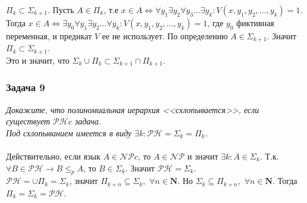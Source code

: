 \documentclass{article}
\begin{document}
$\Pi_k \subset \Sigma_{k+1}$. Пусть $A \in \Pi_k$, т.е $x \in A \Leftrightarrow \forall y_{1} \exists y_{2} \forall y_{3} \ldots \exists y_k : V\left(x, y_{1}, y_{2}, \ldots, y_{k}\right)=1$. Тогда $x \in A \Leftrightarrow \exists y_0 \forall y_{1} \exists y_{2} \ldots \forall y_k : V\left(x, y_{1}, y_{2}, \ldots, y_{k}\right)=1$, где $y_{0}$ фиктивная переменная, и предикат $V$ ее не использует. По определению $A \in \Sigma_{k+1}$. Значит $\Pi_k \subset \Sigma_{k+1}$.\\
Это и значит, что $\Sigma_k \cup \Pi_k \subset \Sigma_{k+1} \cap \Pi_{k+1}$.
\subsubsection*{Задача 9}
\textit{Докажите, что полиномиальная иерархия <<схлопывается>>, если существует $\mathcal{PH}c$ задача. \\
Под схлопыванием имеется в виду $\exists k: \mathcal{PH} = \Sigma_k = \Pi_k$.}\\
\\
Действительно, если язык $A \in \mathcal{NP}c$, то $A \in \mathcal{NP}$ и значит $\exists k: A \in \Sigma_k$. Т.к. $\forall B \in \mathcal{PH} \rightarrow B \leq_p A$, то $B \in \Sigma_k$. Значит $\mathcal{PH} = \Sigma_k$.\\
$\mathcal{PH} = \cup \Pi_k = \Sigma_k$, значит $\Pi_{k+n} \subseteq \Sigma_k,$ $\forall n \in \mathbf{N}$. Но $\Sigma_k \subseteq \Pi_{k+n},$  $\forall n \in \mathbf{N}$. Тогда $\Pi_k = \Sigma_k = \mathcal{PH}$.
\end{document}

